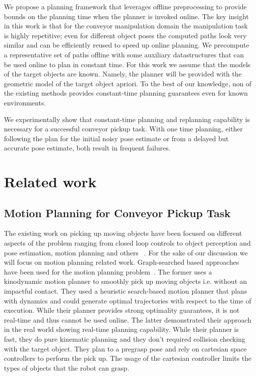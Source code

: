 \documentclass[conference]{IEEEtran}
\begin{document}
We propose a planning framework that leverages offline preprocessing to provide bounds on the planning time when the planner is invoked online. The key insight in this work is that for the conveyor manipulation domain the manipulation task is highly repetitive; even for different object poses the computed paths look very similar and can be efficiently reused to speed up online planning. We precompute a representative set of paths offline with some auxiliary datastructures that can be used online to plan in constant time. For this work we assume that the models of the target objects are known. Namely, the planner will be provided with the geometric model of the target object apriori. To the best of our knowledge, non of the existing methods provides constant-time planning guarantees even for known environments. 

%
We experimentally show that constant-time planning and replanning capability is necessary for a successful conveyor pickup task. With one time planning, either following the plan for the initial noisy pose estimate or from a delayed but accurate pose estimate, both result in frequent failures.

\section{Related work}
\subsection{Motion Planning for Conveyor Pickup Task}
The existing work on picking up moving objects have been focused on different aspects of the problem ranging from closed loop controls to object perception and pose estimation, motion planning and others~\cite{allen1993automated, zhang2018gilbreth, stogl2017tracking, han2019toward} . For the sake of our discussion we will focus on motion planning related work. Graph-searched based approaches have been used for the motion planning problem~\cite{menon2014motion, cowley2013perception}. The former uses a kinodynamic motion planner to smoothly pick up moving objects i.e. without an impactful contact. They used a heuristic search-based motion planner that plans with dynamics and could generate optimal trajectories with respect to the time of execution. While their planner provides strong optimality guarantees, it is not real-time and thus cannot be used online.
%
The latter demonstrated their approach in the real world showing real-time planning capability. While their planner is fast, they do pure kinematic planning and they don't required collision checking with the target object. They plan to a pregrasp pose and rely on cartesian space controllers to perform the pick up. The usage of the cartesian controller limits the types of objects that the robot can grasp.
\end{document}
